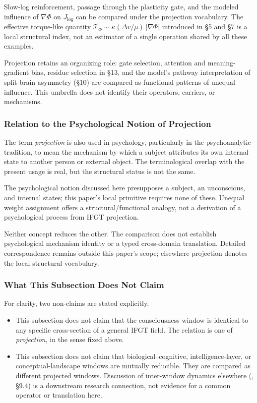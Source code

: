 Slow-log reinforcement, passage through the plasticity gate, and the
modeled influence of \(\nabla\Phi\) on \(J_{\mathrm{log}}\) can be compared
under the projection vocabulary. The effective torque-like quantity
\(\mathcal{T}_\Phi \sim \kappa (\Delta v / \mu)\,|\nabla\Phi|\)
introduced in §5 and §7 is a local structural index, not an estimator of a
single operation shared by all these examples.

Projection retains an organizing role: gate selection, attention and
meaning-gradient bias, residue selection in §13, and the model's pathway
interpretation of split-brain asymmetry (§10) are compared as functional
patterns of unequal influence. This umbrella does not identify their
operators, carriers, or mechanisms.

\subsubsection{Relation to the Psychological Notion of Projection}
\label{sec:projection-disclaimer}

The term \emph{projection} is also used in psychology, particularly in
the psychoanalytic tradition, to mean the mechanism by which a subject
attributes its own internal state to another person or external object.
The terminological overlap with the present usage is real, but the
structural status is not the same.

The psychological notion discussed here presupposes a subject, an
unconscious, and internal states; this paper's local primitive requires none
of these. Unequal weight assignment offers a structural/functional analogy,
not a derivation of a psychological process from IFGT projection.

Neither concept reduces the other. The comparison does not establish
psychological mechanism identity or a typed cross-domain translation.
Detailed correspondence remains outside this paper's scope; elsewhere
projection denotes the local structural vocabulary.

\subsubsection{What This Subsection Does Not Claim}
\label{sec:projected-uses-non-claims}

For clarity, two non-claims are stated explicitly.

\begin{itemize}
  \item This subsection does not claim that the consciousness window is
        identical to any specific cross-section of a general IFGT field.
        The relation is one of \emph{projection}, in the sense fixed
        above.
  \item This subsection does not claim that biological--cognitive,
        intelligence-layer, or conceptual-landscape windows are mutually
        reducible. They are compared as different projected windows.
        Discussion of inter-window dynamics elsewhere
        (\cite{Intelligence}, §9.4) is a downstream research connection,
        not evidence for a common operator or translation here.
\end{itemize}

